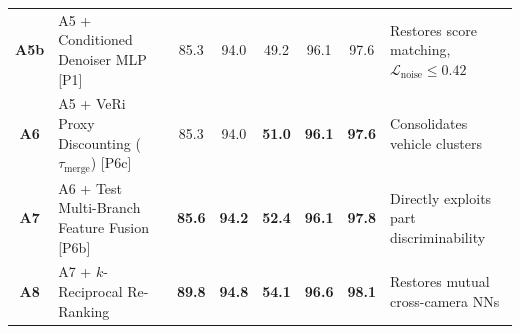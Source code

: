 \begin{table}[ht]
{\begin{tabular}{clcccccl}
\textbf{A5b}& A5 + Conditioned Denoiser MLP [P1] & 85.3 & 94.0 & 49.2 & 96.1 & 97.6 & Restores score matching, $\mathcal{L}_{\text{noise}} \le 0.42$ \\
\textbf{A6} & A5 + VeRi Proxy Discounting ($\tau_{\text{merge}}$) [P6c] & 85.3 & 94.0 & \textbf{51.0} & \textbf{96.1} & \textbf{97.6} & Consolidates vehicle clusters \\
\textbf{A7} & A6 + Test Multi-Branch Feature Fusion [P6b] & \textbf{85.6} & \textbf{94.2} & \textbf{52.4} & \textbf{96.1} & \textbf{97.8} & Directly exploits part discriminability \\
\textbf{A8} & A7 + $k$-Reciprocal Re-Ranking & \textbf{89.8} & \textbf{94.8} & \textbf{54.1} & \textbf{96.6} & \textbf{98.1} & Restores mutual cross-camera NNs \\
\bottomrule
\end{tabular}%
}
\end{table}

